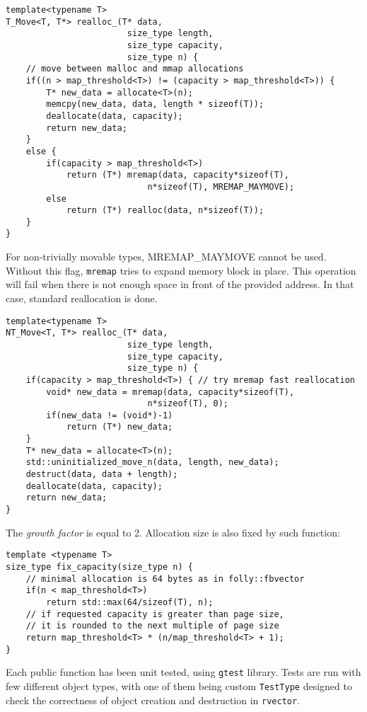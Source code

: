 \documentclass[inz, english, shortabstract]{iithesis}
\begin{document}
\begin{lstlisting}[caption=rvector trivial type reallocation]
template<typename T>
T_Move<T, T*> realloc_(T* data, 
						size_type length, 
						size_type capacity, 
						size_type n) {
	// move between malloc and mmap allocations
	if((n > map_threshold<T>) != (capacity > map_threshold<T>)) {
        T* new_data = allocate<T>(n);
        memcpy(new_data, data, length * sizeof(T));
        deallocate(data, capacity);
        return new_data;
    }
    else {
        if(capacity > map_threshold<T>)
        	return (T*) mremap(data, capacity*sizeof(T), 
                    		n*sizeof(T), MREMAP_MAYMOVE);
        else
        	return (T*) realloc(data, n*sizeof(T));
    }
}
\end{lstlisting}
For non-trivially movable types, MREMAP\_MAYMOVE cannot be used. Without this flag, {\tt mremap} tries to expand memory block in place. This operation will fail when there is not enough space in front of the provided address. In that case, standard reallocation is done.

\begin{lstlisting}[caption=rvector nontrivial type reallocation]
template<typename T>
NT_Move<T, T*> realloc_(T* data, 
						size_type length, 
						size_type capacity, 
						size_type n) {
    if(capacity > map_threshold<T>) { // try mremap fast reallocation
        void* new_data = mremap(data, capacity*sizeof(T), 
                    		n*sizeof(T), 0);
        if(new_data != (void*)-1)
        	return (T*) new_data;
    }
    T* new_data = allocate<T>(n);
    std::uninitialized_move_n(data, length, new_data);
    destruct(data, data + length);
    deallocate(data, capacity);
    return new_data;
}
\end{lstlisting}
The \emph{growth factor} is equal to 2. Allocation size is also fixed by such function: 

\begin{lstlisting}[caption=fix capacity]
template <typename T>
size_type fix_capacity(size_type n) {
	// minimal allocation is 64 bytes as in folly::fbvector
	if(n < map_threshold<T>)
        return std::max(64/sizeof(T), n);
    // if requested capacity is greater than page size,
    // it is rounded to the next multiple of page size
    return map_threshold<T> * (n/map_threshold<T> + 1);
}
\end{lstlisting}
Each public function has been unit tested, using {\tt gtest} library\cite{rvector_tests}. Tests are run with few different object types, with one of them being custom {\tt TestType} designed to check the correctness of object creation and destruction in {\tt rvector}.
\end{document}
